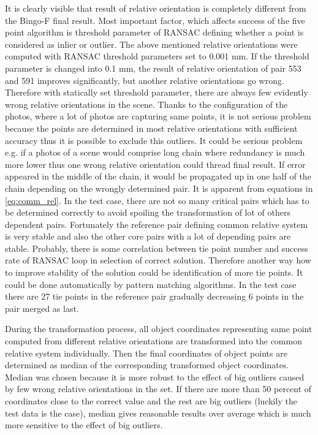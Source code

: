 \documentclass[a4paper,12pt]{article}
\begin{document}
It is clearly visible that result of relative orientation is completely different from the Bingo-F final result.
Most important factor, which affects success of the five point algorithm is threshold parameter of RANSAC defining 
whether a point is considered as inlier or outlier.
The above mentioned relative orientations were computed with RANSAC threshold parameters set to 0.001 mm.
If the threshold parameter is changed into 0.1 mm, the result of relative orientation of pair 553 and 591 improves significantly,
but another relative orientations go wrong. Therefore with statically set threshold parameter, there are always 
few evidently wrong relative orientations in the scene. Thanks to the configuration of the photos, where a lot of photos are 
capturing same points, it is  not serious problem because the points are determined in most relative orientations  with 
sufficient accuracy thus it is possible to exclude this outliers. It could be serious problem e.g. if a photos 
of a scene would comprise long chain where redundancy is much more lower thus   
 one wrong relative orientation could thread final result. If error appeared in the middle 
of the chain, it would  be propagated up in one half of the chain  depending on the wrongly
determined pair. It is apparent from equations in \eqref{eq:comm_rel}. 
In the test case, there are not so many critical pairs which has to be determined correctly to avoid spoiling the transformation 
of lot of others dependent pairs. Fortunately the reference pair defining common relative system is very stable and also 
the other core pairs with a lot of depending pairs are stable. 
Probably, there is some correlation between tie point number 
and success rate of RANSAC loop in selection of correct solution. 
Therefore another way how to improve stability of the solution 
could be identification of more tie points. It could be done automatically by pattern matching algorithms. 
In the test case there 
are 27 tie points in the reference pair gradually decreasing 6 points in the pair merged as last.

During the transformation process, all object coordinates representing same point computed from different relative orientations are 
transformed into  the common relative system individually. Then the final coordinates of object points are determined as median
of the corresponding transformed object coordinates. Median was chosen because it is more robust to the effect of 
big outliers caused by few wrong relative orientations in the set. If there are more than 50 percent of coordinates 
close to the correct value and the rest are big outliers (luckily the test data is the case), median gives reasonable results over average
which is much more sensitive to the effect of big outliers. 
\end{document}
